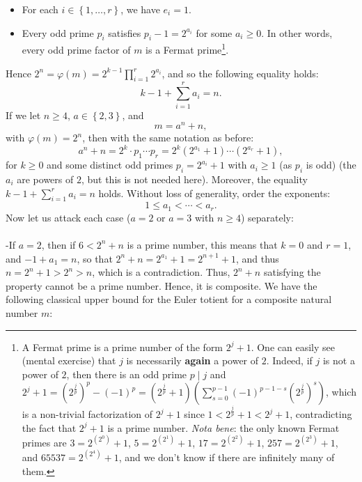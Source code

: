 \begin{solution}
    \begin{itemize}
        \item For each \( i \in \left\{1, \ldots, r\right\} \), we have \( e_i = 1 \).
        \item Every odd prime \( p_i \) satisfies \( p_i - 1 = 2^{a_i} \) for some \( a_i \geq 0 \). In other words, every odd prime factor of \( m \) is a Fermat prime\footnote{A Fermat prime is a prime number of the form \( 2^j + 1 \). One can easily see (mental exercise) that \( j \) is necessarily \textbf{again} a power of \( 2 \). Indeed, if \( j \) is not a power of \( 2 \), then there is an odd prime \( p \mid j \) and \( 2^j + 1 = \left(2^{\frac{j}{p}}\right)^p - \left(-1\right)^p = \left(2^{\frac{j}{p}} + 1\right) \left( \sum_{s=0}^{p-1} \left(-1\right)^{p-1-s} \left(2^{\frac{j}{p}}\right)^s \right) \), which is a non-trivial factorization of \( 2^j + 1 \) since \( 1 < 2^{\frac{j}{p}} + 1 < 2^j + 1 \), contradicting the fact that \( 2^j + 1 \) is a prime number. \textit{Nota bene}: the only known Fermat primes are \( 3 = 2^{\left(2^0\right)} + 1 \), \( 5 = 2^{\left(2^1\right)} + 1 \), \( 17 = 2^{\left(2^{2}\right)} + 1 \), \( 257 = 2^{\left(2^{3}\right)} + 1 \), and \( 65537 = 2^{\left(2^{4}\right)} + 1 \), and we don't know if there are infinitely many of them.}.
    \end{itemize}
    Hence \( 2^n = \varphi\left(m\right) = 2^{k-1} \prod_{i=1}^r 2^{a_i} \), and so the following equality holds:
    \[
        k - 1 + \sum_{i=1}^r a_i = n.
    \]
    If we let \( n \geq 4 \), \( a \in \left\{2,3\right\} \), and
    \[
        m = a^n + n,
    \]
    with \( \varphi\left(m\right) = 2^n \), then with the same notation as before:
    \[
        a^n + n = 2^k \cdot p_1 \cdots p_r = 2^k \left(2^{a_1} + 1\right) \cdots \left(2^{a_r} + 1\right),
    \]
    for \( k \geq 0 \) and some distinct odd primes \( p_i = 2^{a_i} + 1 \) with \( a_i \geq 1 \) (as \( p_i \) is odd) (the \( a_i \) are powers of \( 2 \), but this is not needed here). Moreover, the equality \( k - 1 + \sum_{i=1}^r a_i = n \) holds. Without loss of generality, order the exponents:
    \[
        1 \leq a_1 < \cdots < a_r.
    \]
    Now let us attack each case (\( a=2 \) or \( a=3 \) with \( n\geq 4 \)) separately:
    \\\\
    -If \( a = 2 \), then if \( 6 < 2^n + n \) is a prime number, this means that \( k = 0 \) and \( r = 1 \), and \( -1 + a_1 = n \), so that \( 2^n + n = 2^{a_1} + 1 = 2^{n+1} + 1 \), and thus \( n = 2^n + 1 > 2^n > n \), which is a contradiction. Thus, \( 2^n + n \) satisfying the property cannot be a prime number. Hence, it is composite. We have the following classical upper bound for the Euler totient for a composite natural number \( m \):

\end{solution}
